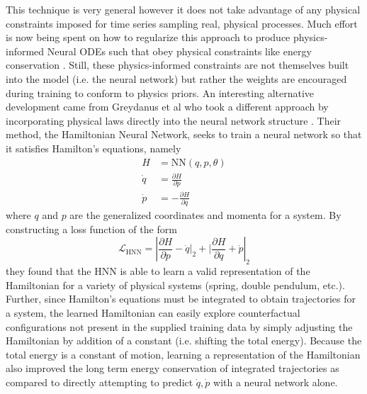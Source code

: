 This technique is very general however it does not take advantage of any physical constraints imposed for time series sampling real, physical processes. Much effort is now being spent on how to regularize this approach to produce physics-informed Neural ODEs such that obey physical constraints like energy conservation \cite{pinode}. Still, these physics-informed constraints are not themselves built into the model (i.e. the neural network) but rather the weights are encouraged during training to conform to physics priors. An interesting alternative development came from Greydanus et al who took a different approach by incorporating physical laws directly into the neural network structure \cite{greydanus-hnn}. Their method, the Hamiltonian Neural Network, seeks to train a neural network so that it satisfies Hamilton's equations, namely
\begin{equation}
  \begin{aligned}
    H &= \text{NN}(q,p,\theta) \\
    \dot{q} &= \frac{\partial H}{\partial p} \\
    \dot{p} &= -\frac{\partial H}{\partial q}
  \end{aligned}
\end{equation}
where $q$ and $p$ are the generalized coordinates and momenta for a system. By constructing a loss function of the form
\begin{equation}
  \mathcal{L}_{\text{HNN}} = \left\lvert \frac{\partial H}{\partial p} - \dot{q}\rvert_2 + \lvert \frac{\partial H}{\partial q} + \dot{p}\right\rvert_2
\end{equation}
they found that the HNN is able to learn a valid representation of the Hamiltonian for a variety of physical systems (spring, double pendulum, etc.). Further, since Hamilton's equations must be integrated to obtain trajectories for a system, the learned Hamiltonian can easily explore counterfactual configurations not present in the supplied training data by simply adjusting the Hamiltonian by addition of a constant (i.e. shifting the total energy). Because the total energy is a constant of motion, learning a representation of the Hamiltonian also improved the long term energy conservation of integrated trajectories as compared to directly attempting to predict $\dot{q},\dot{p}$ with a neural network alone.

